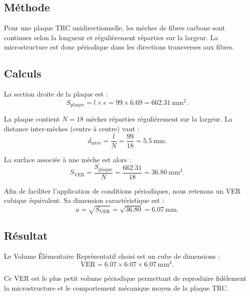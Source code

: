 \documentclass{rapportECL}
\begin{document}
\subsection*{Méthode}
Pour une plaque TRC unidirectionnelle, les mèches de fibres carbone sont continues selon la longueur et régulièrement réparties sur la largeur. La microstructure est donc périodique dans les directions transverses aux fibres.

\subsection*{Calculs}
La section droite de la plaque est :
\begin{equation}
S_{\text{plaque}} = l \times e = 99 \times 6.69 = 662.31\ \si{\milli\meter^2}.
\end{equation}

La plaque contient $N = 18$ mèches réparties régulièrement sur la largeur. La distance inter-mèches (centre à centre) vaut :
\begin{equation}
d_{\text{inter}} = \frac{l}{N} = \frac{99}{18} = 5.5\ \si{\milli\meter}.
\end{equation}

La surface associée à une mèche est alors :
\begin{equation}
S_{\text{VER}} = \frac{S_{\text{plaque}}}{N} = \frac{662.31}{18} = 36.80\ \si{\milli\meter^2}.
\end{equation}

Afin de faciliter l'application de conditions périodiques, nous retenons un VER cubique équivalent. Sa dimension caractéristique est :
\begin{equation}
a = \sqrt{S_{\text{VER}}} = \sqrt{36.80} = 6.07\ \si{\milli\meter}.
\end{equation}

\subsection*{Résultat}
Le Volume Élémentaire Représentatif choisi est un cube de dimensions :
\begin{equation}
\boxed{\text{VER} = 6.07 \times 6.07 \times 6.07\ \si{\milli\meter^3}}.
\end{equation}

Ce VER est le plus petit volume périodique permettant de reproduire fidèlement la microstructure et le comportement mécanique moyen de la plaque TRC.

\end{document}
